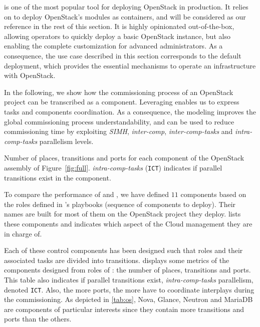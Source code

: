 \kolla is one of the most popular tool for deploying OpenStack in
production.  It relies on \ansible to deploy OpenStack's modules as
\docker containers, and will be considered as our reference in the
rest of this section. It is highly opinionated out-of-the-box,
allowing operators to quickly deploy a basic OpenStack instance, but
also enabling the complete customization for advanced
administrators. As a consequence, the use case described in this
section corresponds to the default \kolla deployment, which provides
the essential mechanisms to operate an infrastructure with OpenStack.

In the following, we show how the commissioning process of an
OpenStack project can be transcribed as a \mad component. Leveraging
\mad enables us to express tasks and components coordination. As a
consequence, the \mad modeling improves the global commissioning
process understandability, and can be used to reduce commissioning
time by exploiting \emph{SIMH}, \emph{inter-comp}, \emph{inter-comp-tasks}
and \emph{intra-comp-tasks} parallelism levels.

\begin{table}
  \begin{center}
    
    \caption{Number of places, transitions and ports for each \mad component
        of the OpenStack assembly of Figure~\ref{fig:full}. 
        \emph{intra-comp-tasks} (\texttt{ICT}) indicates if parallel transitions 
        exist in the component.}
    \label{tab:os}
  \end{center}
\end{table}

To compare the performance of \kolla and \mad, we have defined $11$
\mad components based on the \ansible roles defined in \kolla's
playbooks (\ie \ansible sequence of components to deploy). Their
names are built for most of them on the OpenStack project they deploy.
 lists these components and indicates which aspect of the
Cloud management they are in charge of. 
%

Each of these control components has been designed such that \ansible roles and 
their associated tasks are divided into \mad transitions.  displays 
some metrics of the \mad components designed from \ansible roles of 
\kolla: the number of places, transitions and ports.
%
This table also indicates if parallel transitions exist, \ie \emph{intra-comp-tasks} parallelism, denoted \texttt{ICT}. Also, the more ports, the more \mad have to coordinate interplays during the commissioning. As depicted in \cref{tab:os}, Nova, Glance, Neutron and MariaDB are components of particular interests since they contain more transitions and ports than the others.

